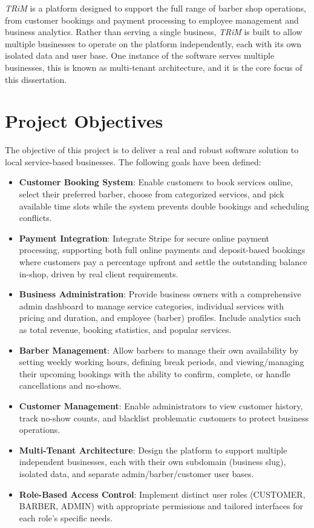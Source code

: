 \textit{TRiM} is a platform designed to support the full range of barber shop operations, from customer bookings and payment processing to employee management and business analytics. Rather than serving a single business, \textit{TRiM} is built to allow multiple businesses to operate on the platform independently, each with its own isolated data and user base. One instance of the software serves multiple businesses, this is known as multi-tenant architecture, and it is the core focus of this dissertation.

\section{Project Objectives}
The objective of this project is to deliver a real and robust software solution to local service-based businesses. The following goals have been defined:
\begin{itemize}
    \item \textbf{Customer Booking System}: Enable customers to book services online, select their preferred barber, choose from categorized services, and pick available time slots while the system prevents double bookings and scheduling conflicts.
    
    \item \textbf{Payment Integration}: Integrate Stripe for secure online payment processing, supporting both full online payments and deposit-based bookings where customers pay a percentage upfront and settle the outstanding balance in-shop, driven by real client requirements.
    
    \item \textbf{Business Administration}: Provide business owners with a comprehensive admin dashboard to manage service categories, individual services with pricing and duration, and employee (barber) profiles. Include analytics such as total revenue, booking statistics, and popular services.
    
    \item \textbf{Barber Management}: Allow barbers to manage their own availability by setting weekly working hours, defining break periods, and viewing/managing their upcoming bookings with the ability to confirm, complete, or handle cancellations and no-shows.
    
    \item \textbf{Customer Management}: Enable administrators to view customer history, track no-show counts, and blacklist problematic customers to protect business operations.
    
    \item \textbf{Multi-Tenant Architecture}: Design the platform to support multiple independent businesses, each with their own subdomain (business slug), isolated data, and separate admin/barber/customer user bases.
    
    \item \textbf{Role-Based Access Control}: Implement distinct user roles (CUSTOMER, BARBER, ADMIN) with appropriate permissions and tailored interfaces for each role's specific needs.
\end{itemize}

